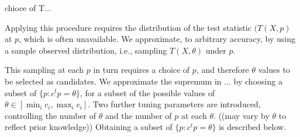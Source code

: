 \documentclass{article}
\newcommand{\T}T
\newcommand{\x}X
\newcommand{\p}p
\renewcommand{\c}c
\begin{document}
chioce of T...

Applying this procedure requires the distribution of the test statistic
$(\T(\x,\p)$ at $\p$, which is often unavailable. We approximate, to arbitrary accuracy, by
using a sample observed distribution, i.e., sampling $\T(\x,\theta)$
under $\p$.

This sampling at each $\p$ in turn requires a choice of $\p$, and
therefore $\theta$ values to be selected as candidates. We approximate
the supremum in ... by choosing a subset of $\{\p:\c^t\p=\theta\}$,
for a subset of the possible values of
$\theta\in[\min_i\c_i,\max_i\c_i]$. Two further tuning parameters are
introduced, controlling the number of $\theta$ and the number of $\p$
at each $\theta$. ((may vary by $\theta$ to reflect prior knowledge)) Obtaining a subset of $\{\p:\c^t\p=\theta\}$ is described below.
\end{document}
